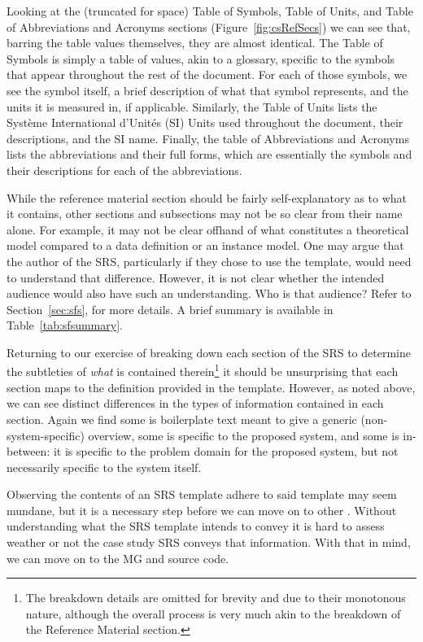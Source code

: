 Looking at the (truncated for space) Table of Symbols, Table of Units, and 
Table of Abbreviations and Acronyms sections (Figure~\ref{fig:csRefSecs}) we 
can see that, barring the table values themselves, they are almost identical. 
The Table of Symbols is simply a table of values, akin to a glossary, specific 
to the symbols that appear throughout the rest of the document. For each of 
those symbols, we see the symbol itself, a brief description of what that 
symbol represents, and the units it is measured in, if applicable. Similarly, 
the Table of Units lists the Syst\`eme International d'Unit\'es (SI) Units used 
throughout the document, their descriptions, and the SI name. Finally, the 
table of Abbreviations and Acronyms lists the abbreviations and their full 
forms, which are essentially the symbols and their descriptions for each of the 
abbreviations.

While the reference material section should be fairly self-explanatory as to 
what it contains, other sections and subsections may not be so clear from their 
name alone. For example, it may not be clear offhand of what constitutes a 
theoretical model compared to a data definition or an instance model. One may 
argue that the author of the SRS, particularly if they chose to use the 
\smithea{} template, would need to understand that difference. However, it is 
not clear whether the intended audience would also have such an understanding. 
Who is that audience? Refer to Section~\ref{sec:sfs}, for more details. A brief 
summary is available in Table~\ref{tab:sfsummary}.

Returning to our exercise of breaking down each section of the SRS to determine 
the subtleties of \emph{what} is contained therein\footnote{The breakdown 
details are omitted for brevity and due to their monotonous nature, although 
the overall process is very much akin to the breakdown of the Reference 
Material section.} it should be unsurprising that each section maps to the 
definition provided in the \smithea{} template. However, as noted above, we can 
see distinct differences in the types of information contained in each section. 
Again we find some is boilerplate text meant to give a generic 
(non-system-specific) overview, some is specific to the proposed system, and 
some is in-between: it is specific to the problem domain for the proposed 
system, but not necessarily specific to the system itself.

Observing the contents of an SRS template adhere to said template may seem 
mundane, but it is a necessary step before we can move on to other \sfs{}. 
Without understanding what the SRS template intends to convey it is hard to 
assess weather or not the case study SRS conveys that information. With that in 
mind, we can move on to the MG and source code.


